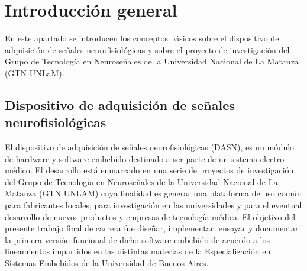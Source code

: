 
\chapter{Introducción general} %

\label{Chapter1} %
\label{IntroGeneral}


\newcommand{\keyword}[1]{\textbf{#1}}
\newcommand{\tabhead}[1]{\textbf{#1}}
\newcommand{\code}[1]{\texttt{#1}}
\newcommand{\file}[1]{\texttt{\bfseries#1}}
\newcommand{\option}[1]{\texttt{\itshape#1}}
\newcommand{\grados}{$^{\circ}$}




En este apartado se introducen los conceptos básicos sobre el dispositivo de adquisición de señales neurofisiológicas y sobre el proyecto de investigación del Grupo de Tecnología en Neuroseñales de la Universidad Nacional de La Matanza (GTN UNLaM).

\section{Dispositivo de adquisición de señales neurofisiológicas}

El dispositivo de adquisición de señales neurofisiológicas (DASN), es un módulo de hardware y software embebido destinado a ser parte de un sistema electro-médico.
El desarrollo está enmarcado en una serie de proyectos de investigación del Grupo de Tecnología en Neuroseñales de la Universidad Nacional de La Matanza (GTN UNLAM) cuya finalidad es generar una plataforma de uso común para fabricantes locales, para investigación en las universidades y para el eventual desarrollo de nuevos productos y empresas de tecnología médica. El objetivo del presente trabajo final de carrera fue diseñar, implementar, ensayar y documentar la primera versión funcional de dicho software embebido de acuerdo a los lineamientos impartidos en las distintas materias de la Especialización en Sistemas Embebidos de la Universidad de Buenos Aires.

